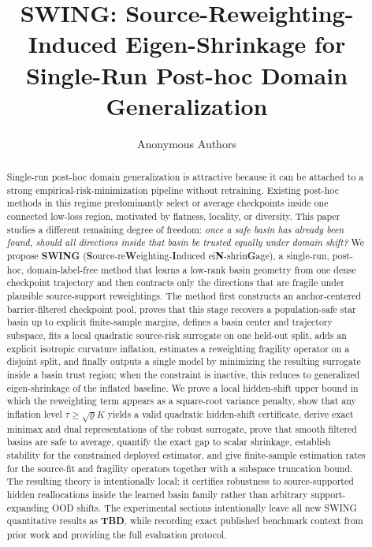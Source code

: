 \documentclass{article}
\title{SWING: Source-Reweighting-Induced Eigen-Shrinkage for Single-Run Post-hoc Domain Generalization}
\author{Anonymous Authors}
\newcommand{\TBD}{\textbf{TBD}}
\newcommand{\swing}{\textup{\textsc{SWING}}}
\newcommand{\ood}{OOD}
\begin{document}
\maketitle

\begin{abstract}
Single-run post-hoc domain generalization is attractive because it can be attached to a strong empirical-risk-minimization pipeline without retraining. Existing post-hoc methods in this regime predominantly select or average checkpoints inside one connected low-loss region, motivated by flatness, locality, or diversity. This paper studies a different remaining degree of freedom: \emph{once a safe basin has already been found, should all directions inside that basin be trusted equally under domain shift?} We propose \textbf{\swing{}} (\textbf{S}ource-re\textbf{W}eighting-\textbf{I}nduced ei\textbf{N}-shrin\textbf{G}age), a single-run, post-hoc, domain-label-free method that learns a low-rank basin geometry from one dense checkpoint trajectory and then contracts only the directions that are fragile under plausible source-support reweightings. The method first constructs an anchor-centered barrier-filtered checkpoint pool, proves that this stage recovers a population-safe star basin up to explicit finite-sample margins, defines a basin center and trajectory subspace, fits a local quadratic source-risk surrogate on one held-out split, adds an explicit isotropic curvature inflation, estimates a reweighting fragility operator on a disjoint split, and finally outputs a single model by minimizing the resulting surrogate inside a basin trust region; when the constraint is inactive, this reduces to generalized eigen-shrinkage of the inflated baseline. We prove a local hidden-shift upper bound in which the reweighting term appears as a square-root variance penalty, show that any inflation level \(\tau\ge \sqrt{\varrho}K\) yields a valid quadratic hidden-shift certificate, derive exact minimax and dual representations of the robust surrogate, prove that smooth filtered basins are safe to average, quantify the exact gap to scalar shrinkage, establish stability for the constrained deployed estimator, and give finite-sample estimation rates for the source-fit and fragility operators together with a subspace truncation bound. The resulting theory is intentionally local: it certifies robustness to source-supported hidden reallocations inside the learned basin family rather than arbitrary support-expanding \ood{} shifts. The experimental sections intentionally leave all new \swing{} quantitative results as \TBD{}, while recording exact published benchmark context from prior work and providing the full evaluation protocol.
\end{abstract}
\end{document}
